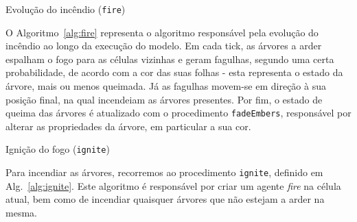 
\begin{algorithm}
    \caption{Evolução do incêndio (\texttt{fire})}\label{alg:fire}
    \fadeEmbers{}\;
    \tick{}\;
\end{algorithm}

O Algoritmo~\ref{alg:fire} representa o algoritmo responsável pela evolução do incêndio ao longo da execução do modelo. Em cada tick, as árvores a arder espalham o fogo para as células vizinhas e geram fagulhas, segundo uma certa probabilidade, de acordo com a cor das suas folhas - esta representa o estado da árvore, mais ou menos queimada. Já as fagulhas movem-se em direção à sua posição final, na qual incendeiam as árvores presentes. Por fim, o estado de queima das árvores é atualizado com o procedimento \texttt{fadeEmbers}, responsável por alterar as propriedades da árvore, em particular a sua cor.

\begin{algorithm}
    \caption{Ignição do fogo (\texttt{ignite})}\label{alg:ignite}
    \;
\end{algorithm}

Para incendiar as árvores, recorremos ao procedimento \texttt{ignite}, definido em Alg.~\ref{alg:ignite}. Este algoritmo é responsável por criar um agente \textit{fire} na célula atual, bem como de incendiar quaisquer árvores que não estejam a arder na mesma.


